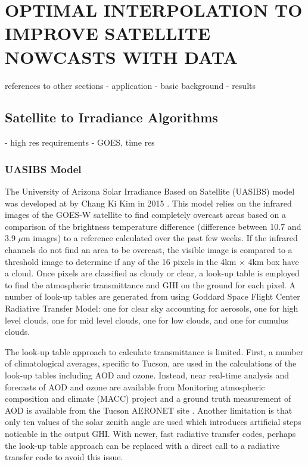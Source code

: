 \chapter{OPTIMAL INTERPOLATION TO IMPROVE SATELLITE NOWCASTS WITH DATA}
\label{chap:satoi}

references to other sections
- application
- basic background
- results

\section{Satellite to Irradiance Algorithms}
- high res requirements
- GOES, time res

\subsection{UASIBS Model}
The University of Arizona Solar Irradiance Based on Satellite (UASIBS)
model was developed at by Chang Ki Kim in 2015 \citep{Kim2016}.
This model relies on the infrared images of the GOES-W satellite to
find completely overcast areas based on a comparison of the brightness
temperature difference (difference between 10.7 and 3.9 $\mu$m
images) to a reference calculated over the past few weeks.
If the infrared channels do not find an area to be overcast, the
visible image is compared to a threshold image to determine if any of
the 16 pixels in the 4km $\times$ 4km box have a cloud.
Once pixels are classified as cloudy or clear, a look-up table is
employed to find the atmospheric transmittance and GHI on the ground
for each pixel.
A number of look-up tables are generated from using Goddard Space
Flight Center Radiative Transfer Model: one for clear sky
accounting for aerosols, one for high level clouds, one for mid level
clouds, one for low clouds, and one for cumulus clouds.

The look-up table approach to calculate transmittance is limited.
First, a number of climatological averages, specific to Tucson, are
used in the calculations of the look-up tables including AOD and
ozone.
Instead, near real-time analysis and forecasts of AOD and ozone are
available from Monitoring atmospheric composition and climate (MACC)
project \citep{Morcrette2009} and a ground truth measurement of AOD is
available from the Tucson AERONET site \citep{Holben1998}.
Another limitation is that only ten values of the solar zenith angle
are used which introduces artificial steps noticable in the output
GHI.
With newer, fast radiative transfer codes, perhaps the look-up table
approach can be replaced with a direct call to a radiative transfer
code to avoid this issue.

